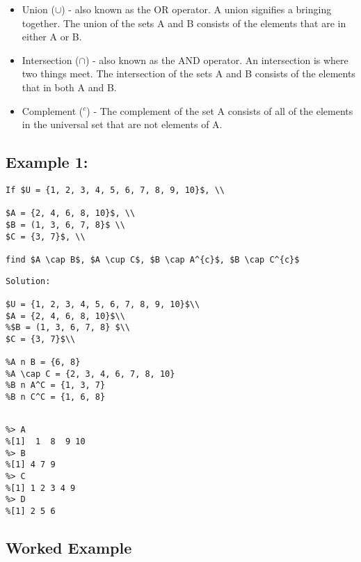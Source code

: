 \begin{itemize}
\item Union ($\cup$) - also known as the OR operator. A union signifies a bringing together. The union of the sets A and B consists of the elements that are in either A or B.
\item Intersection ($\cap$) - also known as the AND operator. An intersection is where two things meet. The intersection of the sets A and B consists of the elements that in both A and B.
\item Complement ($^{c}$) - The complement of the set A consists of all of the elements in the universal set that are not elements of A.
\end{itemize}



\subsection*{Example 1: }
\begin{verbatim}
If $U = {1, 2, 3, 4, 5, 6, 7, 8, 9, 10}$, \\

$A = {2, 4, 6, 8, 10}$, \\
$B = (1, 3, 6, 7, 8}$ \\
$C = {3, 7}$, \\

find $A \cap B$, $A \cup C$, $B \cap A^{c}$, $B \cap C^{c}$
\end{verbatim}
\begin{verbatim}
Solution: 

$U = {1, 2, 3, 4, 5, 6, 7, 8, 9, 10}$\\
$A = {2, 4, 6, 8, 10}$\\
%$B = (1, 3, 6, 7, 8} $\\
$C = {3, 7}$\\

%A n B = {6, 8}
%A \cap C = {2, 3, 4, 6, 7, 8, 10}
%B n A^C = {1, 3, 7}
%B n C^C = {1, 6, 8}
\end{verbatim}
\begin{verbatim}

%> A
%[1]  1  8  9 10
%> B
%[1] 4 7 9
%> C
%[1] 1 2 3 4 9
%> D
%[1] 2 5 6
\end{verbatim}







\subsection*{Worked Example}

